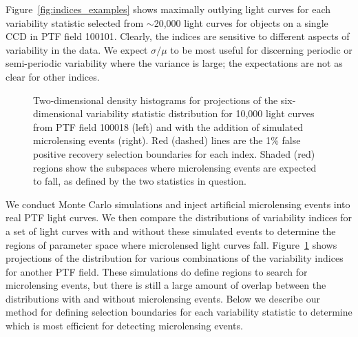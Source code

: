 \documentclass{emulateapj}
\begin{document}
Figure~\ref{fig:indices_examples} shows maximally outlying light curves for each variability statistic selected from $\sim$20,000 light curves for objects on a single CCD in PTF field 100101. %
Clearly, the indices are sensitive to different aspects of variability in the data. We expect $\sigma/\mu$ to be most useful for discerning periodic or semi-periodic variability where the variance is large; the expectations are not as clear for other indices. 

\begin{figure}[h]
\centering
	
	
	\caption{Two-dimensional density histograms for projections of the six-dimensional variability statistic distribution for 10,000 light curves from PTF field 100018 (left) and with the addition of simulated microlensing events (right). Red (dashed) lines are the 1\% false positive recovery selection boundaries for each index. Shaded (red) regions show the subspaces where microlensing events are expected to fall, as defined by the two statistics in question. } 
	\label{fig:var_indices}
\end{figure}

We conduct Monte Carlo simulations and inject artificial microlensing events into real PTF light curves. We then compare the distributions of variability indices for a set of light curves with and without these simulated events to determine the regions of parameter space where microlensed light curves fall. Figure~\ref{fig:var_indices} shows projections of the distribution for various combinations of the variability indices for another PTF field. These simulations do define regions to search for microlensing events, but there is still a large amount of overlap between the distributions with and without microlensing events. Below we describe our method for defining selection boundaries for each variability statistic to determine which is most efficient for detecting microlensing events.
\end{document}
